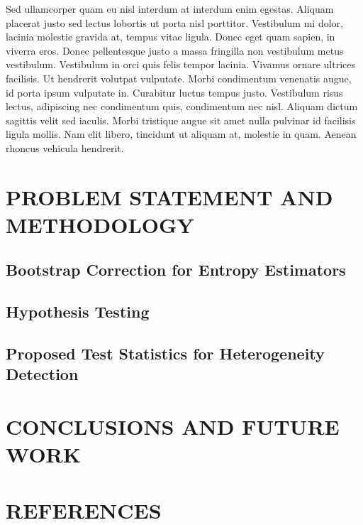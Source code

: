 \documentclass[
  letterpaper,
  11pt,
  english,
  doublespacing,
  headsepline,
  consistentlayout,
  oneside,
  openany]{MastersDoctoralThesis}
\begin{document}
Sed ullamcorper quam eu nisl interdum at interdum enim egestas. Aliquam
placerat justo sed lectus lobortis ut porta nisl porttitor. Vestibulum
mi dolor, lacinia molestie gravida at, tempus vitae ligula. Donec eget
quam sapien, in viverra eros. Donec pellentesque justo a massa fringilla
non vestibulum metus vestibulum. Vestibulum in orci quis felis tempor
lacinia. Vivamus ornare ultrices facilisis. Ut hendrerit volutpat
vulputate. Morbi condimentum venenatis augue, id porta ipsum vulputate
in. Curabitur luctus tempus justo. Vestibulum risus lectus, adipiscing
nec condimentum quis, condimentum nec nisl. Aliquam dictum sagittis
velit sed iaculis. Morbi tristique augue sit amet nulla pulvinar id
facilisis ligula mollis. Nam elit libero, tincidunt ut aliquam at,
molestie in quam. Aenean rhoncus vehicula hendrerit.


\chapter{PROBLEM STATEMENT AND METHODOLOGY}\label{sec-Chapter3}

\section{Bootstrap Correction for Entropy
Estimators}\label{bootstrap-correction-for-entropy-estimators}

\section{Hypothesis Testing}\label{hypothesis-testing}

\section{Proposed Test Statistics for Heterogeneity
Detection}\label{proposed-test-statistics-for-heterogeneity-detection}


\chapter{CONCLUSIONS AND FUTURE WORK}\label{sec-Chapter5}


\chapter*{REFERENCES}\label{references}
\end{document}
